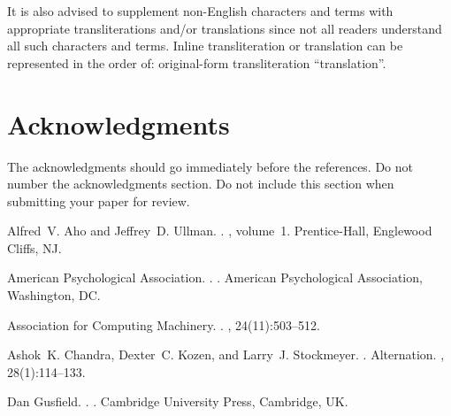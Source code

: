 \documentclass[11pt]{article}
\begin{document}
It is also advised to supplement non-English characters and terms
with appropriate transliterations and/or translations
since not all readers understand all such characters and terms.
Inline transliteration or translation can be represented in
the order of: original-form transliteration ``translation''.



\section*{Acknowledgments}

The acknowledgments should go immediately before the references.  Do
not number the acknowledgments section. Do not include this section
when submitting your paper for review.

%
%

\begin{thebibliography}{}

Alfred~V. Aho and Jeffrey~D. Ullman.
.
, volume~1.
\newblock Prentice-{Hall}, Englewood Cliffs, NJ.

{American Psychological Association}.
.
.
\newblock American Psychological Association, Washington, DC.

{Association for Computing Machinery}.
.
, 24(11):503--512.

Ashok~K. Chandra, Dexter~C. Kozen, and Larry~J. Stockmeyer.
.
\newblock Alternation.
,
  28(1):114--133.

Dan Gusfield.
.
.
\newblock Cambridge University Press, Cambridge, UK.

\end{thebibliography}
\end{document}
